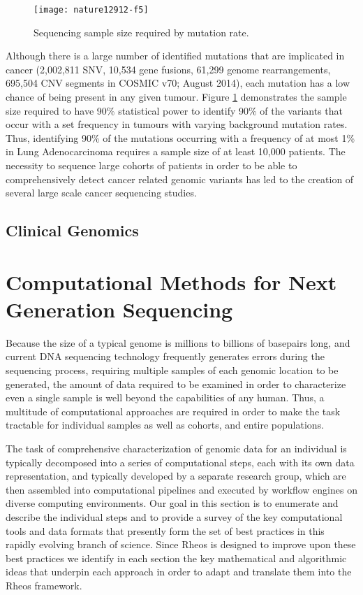 \begin{figure}[H]
\texttt{[image: nature12912-f5]}
\centering
\caption {Sequencing sample size required by mutation rate\autocite{lawrence2014discovery}.}
\label{fig:nature12912-f5}
\end{figure}

Although there is a large number of identified mutations that are implicated in cancer (2,002,811 SNV,  10,534 gene fusions, 61,299 genome rearrangements, 695,504 CNV segments in COSMIC v70; August 2014)\autocite{forbes2015cosmic}, each mutation has a low chance of being present in any given tumour. Figure \ref{fig:nature12912-f5} demonstrates the sample size required to have 90\% statistical power to identify  90\% of the variants that occur with a set frequency in tumours with varying background mutation rates. Thus, identifying 90\% of the mutations occurring with a frequency of at most 1\% in Lung Adenocarcinoma requires a sample size of at least 10,000 patients. The necessity to sequence large cohorts of patients in order to be able to comprehensively detect  cancer related genomic variants has led to the creation of several large scale cancer sequencing studies.

\subsection{Clinical Genomics}

\section{Computational Methods for Next Generation Sequencing}
Because the size of a typical genome is millions to billions of basepairs long, and current DNA sequencing technology frequently generates errors during the sequencing process, requiring multiple samples of each genomic location to be generated, the amount of data required to be examined in order to characterize even a single sample is well beyond the capabilities of any human. Thus, a multitude of computational approaches are required in order to make the task tractable for individual samples as well as cohorts, and entire populations.

The task of comprehensive characterization of genomic data for an individual is typically decomposed into a series of computational steps, each with its own data representation, and typically developed by a separate research group, which are then assembled into computational pipelines and executed by workflow engines on diverse computing environments. Our goal in this section is to enumerate and describe the individual steps and to provide a survey of the key computational tools and data formats that presently form the set of best practices in this rapidly evolving branch of science. Since Rheos is designed to improve upon these best practices we identify in each section the key mathematical and algorithmic ideas that underpin each approach in order to adapt and translate them into the Rheos framework.

